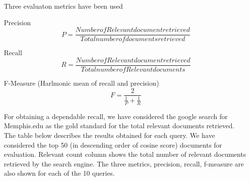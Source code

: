 \label{sec:results}
Three evaluaton metrics have been used

Precision
\begin{equation}
  P = \frac{{Number of Relevant document retrieved}}{{Total number of documents retrieved}}
\end{equation}

Recall
\begin{equation}
  R = \frac{{Number of Relevant document retrieved}}{{Total number of Relevant documents}}
\end{equation}

F-Measure (Harlmonic mean of recall and precision)
\begin{equation}
  F = \frac{2}{\frac{1}{P} + \frac{1}{R}}
\end{equation}

For obtaining a dependable recall, we have considered the google search for Memphis.edu as the gold standard for the total relevant documents retrieved. The table below describes the results obtained for each query. We have considered the top 50 (in descending order of cosine score) documents for evaluation. Relevant count column shows the total number of relevant documents retrieved by the search engine. The three metrics, precision, recall, f-measure are also shown for each of the 10 queries.